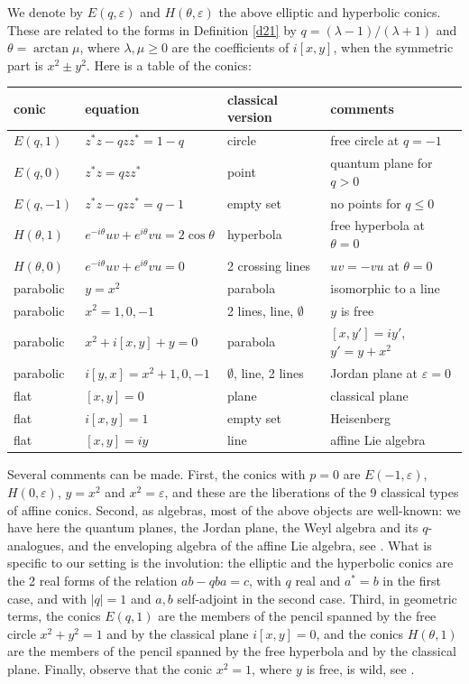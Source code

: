 \documentclass[11pt]{amsart}
\theoremstyle{definition}
\begin{document}
We denote by $E(q,\varepsilon)$ and $H(\theta,\varepsilon)$ the above elliptic and hyperbolic conics. These are related to the forms in Definition \ref{d21} by $q=(\lambda-1)/(\lambda+1)$ and $\theta=\arctan\mu$, where $\lambda,\mu\geq0$ are the coefficients of $i[x,y]$, when the symmetric part is $x^2\pm y^2$. Here is a table of the conics:

\begin{center}
\begin{tabular}{|l|l|l|l|}
\hline
conic&equation&classical version&comments\\
\hline
$E(q,1)$&$z^*z-qzz^*=1-q$&circle&free circle at $q=-1$\\
\hline
$E(q,0)$&$z^*z=qzz^*$&point&quantum plane for $q>0$\\
\hline
$E(q,-1)$&$z^*z-qzz^*=q-1$&empty set&no points for $q\leq0$\\
\hline
$H(\theta,1)$&$e^{-i\theta}uv+e^{i\theta}vu=2\cos\theta$&hyperbola&free hyperbola at $\theta=0$\\
\hline
$H(\theta,0)$&$e^{-i\theta}uv+e^{i\theta}vu=0$&2 crossing lines&$uv=-vu$ at $\theta=0$\\
\hline
parabolic&$y=x^2$&parabola&isomorphic to a line\\
\hline
parabolic&$x^2=1,0,-1$&2 lines, line, $\emptyset$&$y$ is free\\
\hline
parabolic&$x^2+i[x,y]+y=0$&parabola&$[x,y']=iy'$, $y'=y+x^2$\\
\hline
parabolic&$i[y,x]=x^2+1,0,-1$&$\emptyset$, line, 2 lines&Jordan plane at $\varepsilon=0$\\
\hline
flat&$[x,y]=0$&plane&classical plane\\
\hline
flat&$i[x,y]=1$&empty set&Heisenberg\\
\hline
flat&$[x,y]=iy$&line&affine Lie algebra\\
\hline
\end{tabular}
\end{center}

\medskip

Several comments can be made. First, the conics with $p=0$ are $E(-1,\varepsilon)$, $H(0,\varepsilon)$, $y=x^2$ and $x^2=\varepsilon$, and these are the liberations of the 9 classical types of affine conics. Second, as algebras, most of the above objects are well-known: we have here the quantum planes, the Jordan plane, the Weyl algebra and its $q$-analogues, and the enveloping algebra of the affine Lie algebra, see \cite{ash}. What is specific to our setting is the involution: the elliptic and the hyperbolic conics are the 2 real forms of the relation $ab-qba=c$, with $q$ real and $a^*=b$ in the first case, and with $|q|=1$ and $a,b$ self-adjoint in the second case. Third, in geometric terms, the conics $E(q,1)$ are the members of the pencil spanned by the free circle $x^2+y^2=1$ and by the classical plane $i[x,y]=0$, and the conics $H(\theta,1)$ are the members of the pencil spanned by the free hyperbola and by the classical plane. Finally, observe that the conic $x^2=1$, where $y$ is free, is wild, see \cite{os1}.
\end{document}
